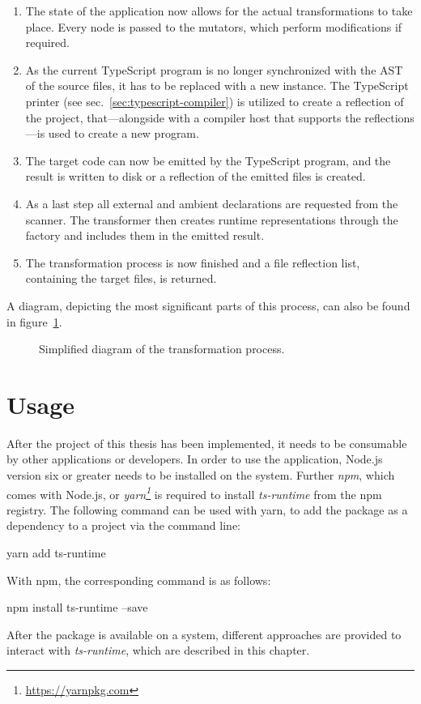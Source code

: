 \begin{enumerate}
  \item The state of the application now allows for the actual transformations to take place. Every node is passed to the mutators, which perform modifications if required.
  \item As the current TypeScript program is no longer synchronized with the AST of the source files, it has to be replaced with a new instance. The TypeScript printer (see sec.~\ref{sec:typescript-compiler}) is utilized to create a reflection of the project, that---alongside with a compiler host that supports the reflections---is used to create a new program.
  \item The target code can now be emitted by the TypeScript program, and the result is written to disk or a reflection of the emitted files is created.
  \item As a last step all external and ambient declarations are requested from the scanner. The transformer then creates runtime representations through the factory and includes them in the emitted result.
  \item The transformation process is now finished and a file reflection list, containing the target files, is returned.
\end{enumerate}
A diagram, depicting the most significant parts of this process, can also be found in figure~\ref{fig:transformation-process}.
\begin{figure}
\centering

\caption{Simplified diagram of the transformation process.}
\label{fig:transformation-process}
\end{figure}

\section{Usage}
\label{sec:usage}

After the project of this thesis has been implemented, it needs to be consumable by other applications or developers. In order to use the application, Node.js version six or greater needs to be installed on the system. Further \emph{npm}, which comes with Node.js, or \emph{yarn\footnote{\url{https://yarnpkg.com}}} is required to install \emph{ts-runtime} from the npm registry. The following command can be used with yarn, to add the package as a dependency to a project via the command line:
\begin{GenericCode}[numbers=none]
yarn add ts-runtime
\end{GenericCode}
With npm, the corresponding command is as follows:
\begin{GenericCode}[numbers=none]
npm install ts-runtime --save
\end{GenericCode}
After the package is available on a system, different approaches are provided to interact with \emph{ts-runtime}, which are described in this chapter.

